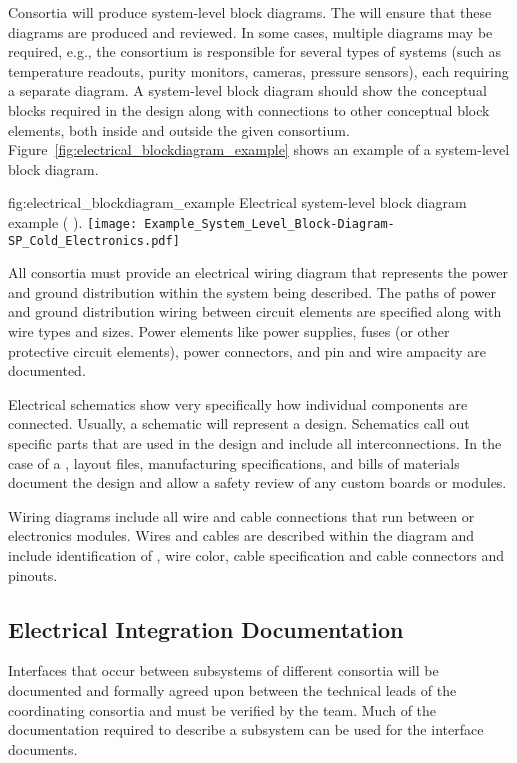 Consortia will produce system-level block diagrams. The 
will ensure that these diagrams are produced and reviewed.  In some
cases, multiple diagrams may be required, e.g., the 
consortium is responsible for several types of systems (such as
temperature readouts, purity monitors, cameras, pressure sensors),
each requiring a separate diagram. A system-level block diagram should
show the conceptual blocks required in the design along with
connections to other conceptual block elements, both inside and
outside the given consortium.
Figure~\ref{fig:electrical_blockdiagram_example} shows an example of a
system-level block diagram.
\begin{dunefigure}{fig:electrical_blockdiagram_example}
  {Electrical system-level block diagram example ( ).}
 \texttt{[image: Example\_System\_Level\_Block-Diagram-SP\_Cold\_Electronics.pdf]}
\end{dunefigure}


All consortia must provide an electrical wiring diagram that 
represents the power and ground distribution within the system being
described.  The paths of power and ground distribution wiring between
circuit elements are specified along with wire types and sizes.  Power
elements like power supplies, fuses (or other protective circuit
elements), power connectors, and pin and wire ampacity are documented.


Electrical schematics show very specifically how individual
components are connected.  Usually, a schematic will represent a
 design.  Schematics call out specific
parts that are used in the design and include all interconnections.
In the case of a , layout files, manufacturing
specifications, and bills of materials document
the design and allow a safety review of any custom boards or
modules.


Wiring diagrams include all wire and cable connections that run
between  or electronics modules.  Wires and
cables are described within the diagram and include identification of
, wire color, cable specification and
cable connectors and pinouts.


\subsection{Electrical Integration Documentation}
\label{sec:fdsp-coord-integ-electrical}

Interfaces that occur between subsystems of different consortia will
be documented and formally agreed upon between the technical leads of
the coordinating consortia and must be verified by the 
team.  Much of the documentation required to describe a subsystem can
be used for the interface documents.

